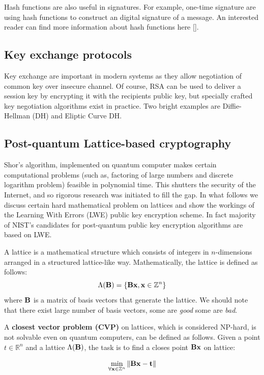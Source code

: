 Hash functions are also useful in signatures. For example, one-time signature are using 
hash functions to construct an digital signature of a message. An interested reader can 
find more information about hash functions here [].

\subsection{Key exchange protocols}

Key exchange are important in modern systems as they allow negotiation of common 
key over insecure channel. Of course, RSA can be used to deliver a session key
by encrypting it with the recipients public key, but specially crafted key negotiation
algorithms exist in practice. Two bright examples are Diffie-Hellman (DH) and Eliptic Curve 
DH. 


\subsection{Post-quantum Lattice-based cryptography}

Shor's algorithm, implemented on quantum computer makes certain computational 
problems (such as, factoring of large numbers and discrete logarithm problem) 
feasible in polynomial time. This shutters the security of the Internet, and 
so rigorous research was initiated to fill the gap. In what follows we discuss
certain hard mathematical problem on lattices and show the workings of the 
Learning With Errors (LWE) public key encryption scheme. In fact majority of 
NIST's candidates for post-quantum public key encryption algorithms are based 
on LWE.

A lattice is a mathematical structure which consists of integers in $n$-dimensions 
arranged in a structured lattice-like way. Mathematically, the lattice is defined as follows:
$$\Lambda({\bf B}) = \{{\bf Bx}, {\bf x} \in \mathbb{Z}^n \}$$ where ${\bf B}$ is a matrix of basis vectors
that generate the lattice. We should note that there exist large number of basis vectors, some are {\it good}
some are {\it bad}.

A { \bf closest vector problem (CVP) } on lattices, which is considered NP-hard, is not solvable even on 
quantum computers, can be defined as follows. Given a point $t \in \mathbb{R}^n$ and a lattice
$\Lambda({\bf B})$, the task is to find a closes point ${\bf Bx}$ on lattice: 

$$\min_{\forall {\bf x} \in \mathbb{Z}^n} \|{\bf Bx} - {\bf t}\|$$ 

